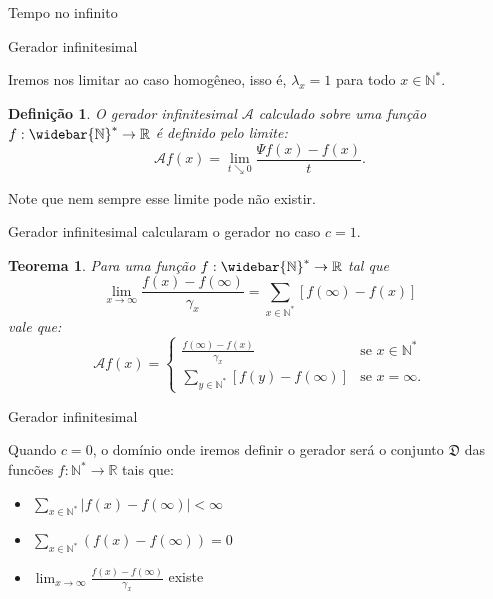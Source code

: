 \documentclass[xcolor=pdftex,dvipsnames]{beamer}
\newcommand{\AAA}{{\mathcal{A}}}
\newcommand{\DDD}{{\mathfrak{D}}}
\newcommand{\Nz}{{\mathbb{N^*}}}
\newcommand{\Nzb}{{\mathbb{\widebar{N}^*}}}
\newcommand{\R}{{\mathbb{R}}}
\newtheorem{teorema}{Teorema}
\newtheorem{definicao}{Definição}
\begin{document}
\begin{frame}{Tempo no infinito}
  
\end{frame}


\begin{frame}{Gerador infinitesimal}

  Iremos nos limitar ao caso homogêneo, isso é, $\lambda_x = 1$ para
  todo $x \in \Nz$.

  \begin{definicao}
    O gerador infinitesimal $\AAA$ calculado sobre uma função $f: \Nzb
    \to \R$ é definido pelo limite:
    \begin{displaymath}
      \AAA f (x) = \lim_{t \searrow 0} \frac{\Psi f (x) - f(x)}{t}.
    \end{displaymath}
  \end{definicao}

  Note que nem sempre esse limite pode não existir.

\end{frame}  


\begin{frame}{Gerador infinitesimal}
  \cite{kendall:56} calcularam o gerador no caso $c = 1$.

  \begin{teorema}
  Para uma função $f: \Nzb \to \R$ tal que
  \begin{displaymath}
    \lim_{x \to \infty}
    \frac{f(x) - f(\infty)}{\gamma_x} = \sum_{x \in \Nz}
    [f(\infty) - f(x)]
  \end{displaymath}
  vale que:
  \begin{displaymath}
    \AAA f (x) = \begin{cases}
      \displaystyle
      \frac{f(\infty) - f(x)}{\gamma_x} & \text{se } x \in \Nz\\
      \displaystyle
      \sum_{y\in \Nz} [f(y) - f(\infty)] & \text{se } x = \infty.
    \end{cases}
  \end{displaymath}
\end{teorema}
\end{frame}

\begin{frame}{Gerador infinitesimal}

  Quando $c = 0$, o domínio onde iremos definir o gerador será 
  o conjunto $\DDD$ das funcões $f: \Nz \to \R$ tais que:

  \begin{itemize}
  \item $\displaystyle \sum_{x\in \Nz} |f(x)-f(\infty)| < \infty$
  \item $\displaystyle \sum_{x\in \Nz} \left( f(x)-f(\infty)\right) = 0$
  \item $\displaystyle \lim_{x \to \infty} \frac{f(x) -
      f(\infty)}{\gamma_x}$ existe
  \end{itemize}  
\end{frame}
\end{document}
